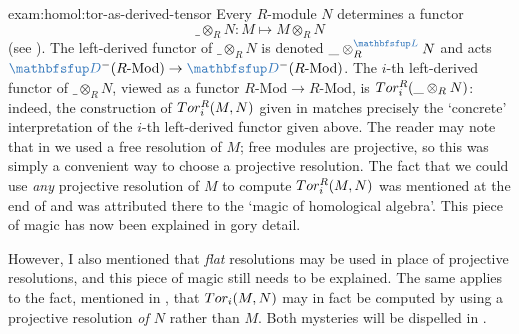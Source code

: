 \begin{exam}{}{exam:homol:tor-as-derived-tensor}
  Every $R$-module $N$ determines a functor
  \[
    \_ \otimes_R N : M \mapsto M \otimes_R N
  \]
  (see
  ). The
  left-derived functor of $\_ \otimes_R N$ is denoted
  $\_ \otimes^{\categ{L}}_R N$ and acts
  $\categ{D}^-(R\text{-Mod}) \to \categ{D}^-(R\text{-Mod})$. The
  $i$-th left-derived functor of $\_ \otimes_R N$, viewed as a functor
  $R\text{-Mod} \to R\text{-Mod}$, is $Tor^R_i (\_ \otimes_R N)$:
  indeed, the construction of $Tor^R_i (M, N)$ given in
   matches precisely the
  `concrete' interpretation of the $i$-th left-derived functor given
  above. The reader may note that in
   we used a free resolution
  of $M$; free modules are projective, so this was simply a convenient
  way to choose a projective resolution. The fact that we could use
  \emph{any} projective resolution of $M$ to compute $Tor^R_i(M, N)$
  was mentioned at the end of
   and was attributed there
  to the `magic of homological algebra'. This piece of magic has now
  been explained in gory detail.

  However, I also mentioned that \emph{flat} resolutions may be used
  in place of projective resolutions, and this piece of magic still
  needs to be explained. The same applies to the fact, mentioned in
  , that $Tor_i(M, N)$ may in
  fact be computed by using a projective resolution \emph{of $N$}
  rather than $M$. Both mysteries will be dispelled in
  .
\end{exam}

